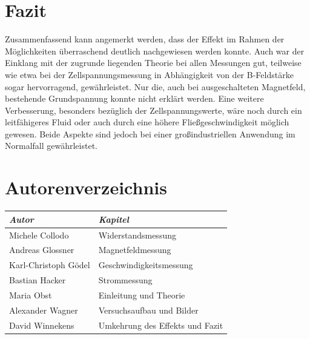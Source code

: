 \documentclass[11pt]{scrartcl}
\begin{document}
\section{Fazit}		%
Zusammenfassend kann angemerkt werden, dass der Effekt im Rahmen der Möglichkeiten überraschend deutlich nachgewiesen werden konnte. Auch war der Einklang mit der zugrunde liegenden Theorie bei allen Messungen gut, teilweise wie etwa bei der Zellspannungsmessung in Abhängigkeit von der B-Feldstärke sogar hervorragend, gewährleistet. Nur die, auch bei ausgeschalteten Magnetfeld, bestehende Grundspannung konnte nicht erklärt werden. Eine weitere Verbesserung, besonders bezüglich der Zellspannungswerte, wäre noch durch ein leitfähigeres Fluid oder auch durch eine höhere Fließgeschwindigkeit möglich gewesen. Beide Aspekte sind jedoch bei einer großindustriellen Anwendung im Normalfall gewährleistet.





\newpage
\section{Autorenverzeichnis}
\begin{tabular}{|l|l|}
\hline
\emph{Autor} & \emph{Kapitel}\\
\hline
Michele Collodo & Widerstandsmessung\\
Andreas Glossner & Magnetfeldmessung\\
Karl-Christoph G\"odel & Geschwindigkeitsmessung\\
Bastian Hacker & Strommessung\\
Maria Obst & Einleitung und Theorie\\
Alexander Wagner & Versuchsaufbau und Bilder\\
David Winnekens & Umkehrung des Effekts und Fazit\\
\hline
\end{tabular}
\end{document}
